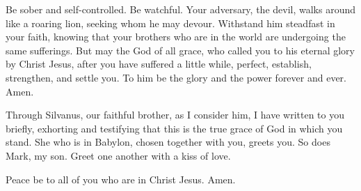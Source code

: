 \begin{paracol}{2}
\begin{otherlanguage}{english}
 Be sober and self-controlled. Be watchful. Your
adversary, the devil, walks around like a roaring lion, seeking whom he
may devour.  Withstand him steadfast in your faith,
knowing that your brothers who are in the world are undergoing the same
sufferings.  But may the God of all grace, who called you
to his eternal glory by Christ Jesus, after you have suffered a little
while, perfect, establish, strengthen, and settle you. 
To him be the glory and the power forever and ever. Amen.

 Through Silvanus, our faithful brother, as I consider
him, I have written to you briefly, exhorting and testifying that this
is the true grace of God in which you stand.  She who is
in Babylon, chosen together with you, greets you. So does Mark, my son.
 Greet one another with a kiss of love.

Peace be to all of you who are in Christ Jesus. Amen.
\end{otherlanguage} \end{paracol}
